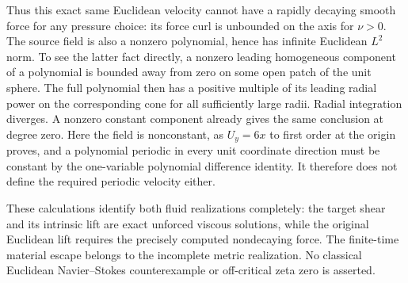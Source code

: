 Thus this exact same Euclidean velocity cannot have a rapidly decaying
smooth force for any pressure choice: its force curl is unbounded on
the axis for $\nu>0$. The source field is also a nonzero polynomial,
hence has infinite Euclidean $L^2$ norm. To see the latter fact directly,
a nonzero leading homogeneous component of a polynomial is bounded
away from zero on some open patch of the unit sphere. The full polynomial
then has a positive multiple of its leading radial power on the
corresponding cone for all sufficiently large radii. Radial integration
diverges. A nonzero constant component already gives the same conclusion
at degree zero. Here the field is nonconstant, as
$U_y=6x$ to first order at the origin proves, and a polynomial periodic
in every unit coordinate direction must be constant by the one-variable
polynomial difference identity. It therefore does not define the
required periodic velocity either.

These calculations identify both fluid realizations completely:
the target shear and its intrinsic lift are exact unforced viscous
solutions, while the original Euclidean lift requires the precisely
computed nondecaying force. The finite-time material escape belongs
to the incomplete metric realization. No classical Euclidean
Navier--Stokes counterexample or off-critical zeta zero is asserted.


